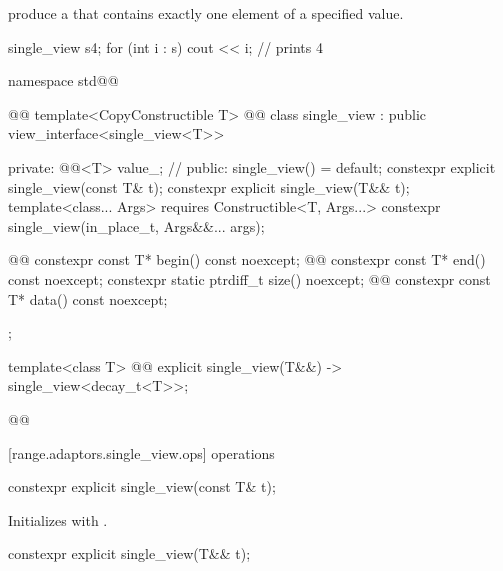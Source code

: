\pnum
{}   produce a
 that contains exactly one element of a
specified value.

\pnum
\begin{example}
\begin{codeblock}
single_view s{4};
for (int i : s)
  cout << i; // prints 4
\end{codeblock}
\end{example}

\begin{codeblock}
namespace std@@ { @@
  template<CopyConstructible T>
    @@
  class single_view : public view_interface<single_view<T>> {
  private:
    @@<T> value_; // \expos
  public:
    single_view() = default;
    constexpr explicit single_view(const T& t);
    constexpr explicit single_view(T&& t);
    template<class... Args>
      requires Constructible<T, Args...>
    constexpr single_view(in_place_t, Args&&... args);

    @@
    constexpr const T* begin() const noexcept;
    @@
    constexpr const T* end() const noexcept;
    constexpr static ptrdiff_t size() noexcept;
    @@
    constexpr const T* data() const noexcept;
  };

  template<class T>
    @@
  explicit single_view(T&&) -> single_view<decay_t<T>>;
}@\oldtxt{\}}@
\end{codeblock}

[range.adaptors.single_view.ops]{ operations}

%
\begin{itemdecl}
constexpr explicit single_view(const T& t);
\end{itemdecl}

\begin{itemdescr}
\pnum
\effects Initializes  with .
\end{itemdescr}

%
\begin{itemdecl}
constexpr explicit single_view(T&& t);
\end{itemdecl}

